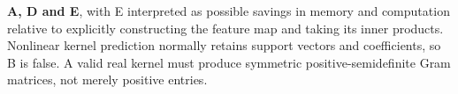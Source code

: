 \textbf{A, D and E}, with E interpreted as possible savings in memory and computation relative to explicitly constructing the feature map and taking its inner products. Nonlinear kernel prediction normally retains support vectors and coefficients, so B is false. A valid real kernel must produce symmetric positive-semidefinite Gram matrices, not merely positive entries.
